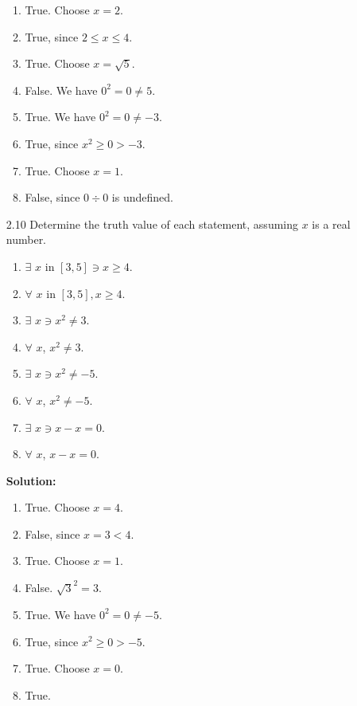 \begin{enumerate}
      \begin{enumerate}
         \item True. Choose $x = 2$.
         \item True, since $2 \le x \le 4$.
         \item True. Choose $x = \sqrt{5}$.
         \item False. We have $0^2 = 0 \neq 5$.
         \item True. We have $0^2 = 0 \neq -3$.
         \item True, since $x^2 \ge 0 > -3$.
         \item True. Choose $x = 1$.
         \item False, since $0 \div 0$ is undefined.
      \end{enumerate}
   \item[2.10] Determine the truth value of each statement, assuming $x$ is a 
               real number.
      \begin{enumerate}
         \item $\exists$ $x$ in $[3,5] \ni x \ge 4$.
         \item $\forall$ $x$ in $[3,5], x \ge 4$.
         \item $\exists$ $x \ni x^2 \neq 3$.
         \item $\forall$ $x$, $x^2 \neq 3$.
         \item $\exists$ $x \ni x^2 \neq -5$.
         \item $\forall$ $x$, $x^2 \neq -5$.
         \item $\exists$ $x \ni x - x = 0$.
         \item $\forall$ $x$, $x - x = 0$.
      \end{enumerate}

      \textbf{Solution:}
      
      \begin{enumerate}
         \item True. Choose $x = 4$.
         \item False, since $x = 3 < 4$.
         \item True. Choose $x = 1$.
         \item False. $\sqrt{3}^2 = 3$.
         \item True. We have $0^2 = 0 \neq -5$.
         \item True, since $x^2 \ge 0 > -5$.
         \item True. Choose $x = 0$.
         \item True. 
      \end{enumerate}
\end{enumerate}

